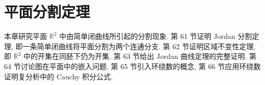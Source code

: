 \chapter{平面分割定理}
\label{chapter:ch10}

本章研究平面 $\mathbb{R}^2$ 中由简单闭曲线所引起的分割现象. 第 61 节证明 Jordan 分割定理, 即一条简单闭曲线将平面分割为两个连通分支. 第 62 节证明区域不变性定理, 即 $\mathbb{R}^2$ 中的开集在同胚下仍为开集. 第 63 节给出 Jordan 曲线定理的完整证明. 第 64 节讨论图在平面中的嵌入问题. 第 65 节引入环绕数的概念, 第 66 节应用环绕数证明复分析中的 Cauchy 积分公式.







